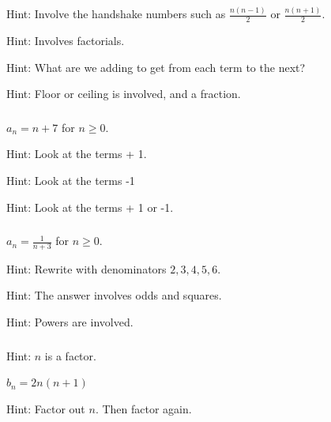 \subsubsection*{ \answers}
\begin{apart}
    \item Hint: Involve the handshake numbers such as $\frac{n(n-1)}{2}$ or $\frac{n(n+1)}{2}$.
    \item Hint: Involves factorials.
    \item Hint: What are we adding to get from each term to the next?
    \item Hint: Floor or ceiling is involved, and a fraction.
\end{apart}

\subsubsection*{ \answers}
\begin{apart}
    \item $a_n=n+7$ for $n \ge 0$.
    \item Hint: Look at the terms + 1.
    \item Hint: Look at the terms -1
    \item Hint: Look at the terms + 1 or -1.
\end{apart}

\subsubsection*{ \answers}
\begin{apart}
    \item $a_n =\frac{1}{n+3}$ for $n \ge 0$.
    \item Hint: Rewrite with denominators $2, 3, 4, 5, 6$.
    \item Hint: The answer involves odds and squares.
    \item Hint: Powers are involved.
\end{apart}

\subsubsection*{ \answers}
\begin{apart}
    \item Hint: $n$ is a factor.
    \item $b_n=2n(n+1)$
    \item Hint: Factor out $n$. Then factor again.
\end{apart}

